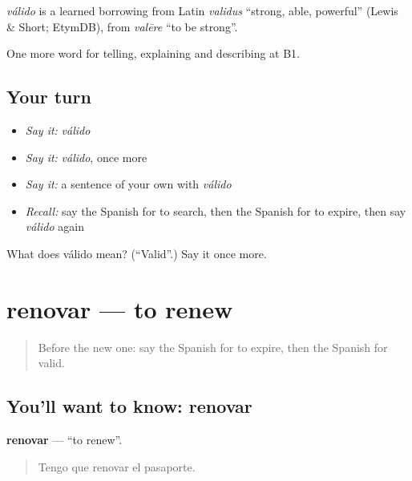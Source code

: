 \begin{cousinweb}
\emph{válido} is a learned borrowing from Latin \emph{validus} \textquotedblleft{}strong, able, powerful\textquotedblright{} (Lewis \& Short; EtymDB), from \emph{valēre} \textquotedblleft{}to be strong\textquotedblright{}.
\end{cousinweb}

\begin{grammarlens}[title={What you've built}]
One more word for telling, explaining and describing at B1.
\end{grammarlens}

\subsection*{Your turn}
\begin{itemize}
\raggedright
  \item \emph{Say it:} \emph{válido}
  \item \emph{Say it:} \emph{válido}, once more
  \item \emph{Say it:} a sentence of your own with \emph{válido}
  \item \emph{Recall:} say the Spanish for to search, then the Spanish for to expire, then say \emph{válido} again
\end{itemize}

\begin{tcolorbox}[breakable,colback=teal!4,colframe=teal!35!black,title={Before you move on}]
What does válido mean? (\textquotedblleft{}Valid\textquotedblright{}.) Say it once more.
\end{tcolorbox}
\section[renovar]{renovar — to renew}

\label{lesson:ES-C657-renovar}



\begin{quote}
Before the new one: say the Spanish for to expire, then the Spanish for valid.
\end{quote}

\subsection*{You'll want to know: renovar}
\textbf{renovar} — \textquotedblleft{}to renew\textquotedblright{}.

\begin{quote}
Tengo que renovar el pasaporte.
\end{quote}

